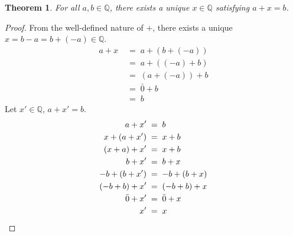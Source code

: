 \documentclass[10pt]{article}
\newtheorem{theorem}{Theorem}[section]
\theoremstyle{definition}
\theoremstyle{remark}
\newcommand{\Q}{\mathbb{Q}}
\begin{document}
        \begin{theorem}
                        For all $a, b \in \Q$, there exists a unique $x \in \Q$ satisfying $a + x = b$.
        \end{theorem}
        \begin{proof}
                From the well-defined nature of $+$, there exists a unique $x = b - a = b + (-a) \in \Q$.
                \begin{align*}
                        a + x \;&=\; a + (b + (-a)) \\
                                \;&=\; a + ((-a) + b) \\
                                \;&=\; (a + (-a)) + b \\
                                \;&=\; \bar{0} + b \\
                                \;&=\; b
                \end{align*}
                Let $x' \in \Q$, $a + x' = b$.
                \begin{align*}
                        a + x' \;&=\; b \\
                        x + (a + x') \;&=\; x + b \\
                        (x + a) + x' \;&=\; x + b \\
                        b + x' \;&=\; b + x \\
                        -b + (b + x') \;&=\; -b + (b + x) \\
                        (-b + b) + x' \;&=\; (-b + b) + x \\
                        \bar{0} + x' \;&=\; \bar{0} + x \\
                        x' \;&=\; x \qedhere
                \end{align*}
        \end{proof}
\end{document}
